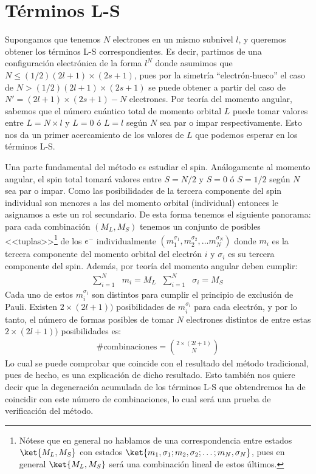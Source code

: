 
\section{Términos L-S}\label{sec: terminos L-S}
Supongamos que tenemos $N$ electrones en un mismo subnivel $l$, y queremos obtener los términos L-S correspondientes. Es decir, partimos de una configuración electrónica de la forma $l^{N}$ donde asumimos que $N \leq (1/2)(2l + 1)\times (2s+1)$, pues por la simetría ``electrón-hueco'' el caso de $N > (1/2)(2l + 1)\times (2s+1)$ se puede obtener a partir del caso de $N' = (2l + 1)\times (2s+1) - N$ electrones. Por teoría del momento angular, sabemos que el número cuántico total de momento orbital $L$ puede tomar valores entre $L= N \times l$ y $ L =0$ ó $L=l$ según $N$ sea par o impar respectivamente. Esto nos da un primer acercamiento de los valores de $L$ que podemos esperar en los términos L-S. \par
Una parte fundamental del método es estudiar el spin. Análogamente al momento angular, el spin total tomará valores entre $S = N/2$ y $S = 0$ ó $S = 1/2$ según $N$ sea par o impar. Como las posibilidades de la tercera componente del spin individual son menores a las del momento orbital (individual) entonces le asignamos a este un rol secundario. De esta forma tenemos el siguiente panorama: para cada combinación $(M_{L},M_{S})$ tenemos un conjunto de posibles <<tuplas>>\footnote{Nótese que en general no hablamos de una correspondencia entre estados $\ket{M_{L},M_{S}}$ con estados $\ket{m_{1}, \sigma_{1};m_{2},\sigma_{2};\dots ; m_{N}, \sigma_{N}}$, pues en general $\ket{M_{L}, M_{S}}$ será una combinación lineal de estos últimos.}  de los $e^{-}$ individualmente $(m_{1}^{\sigma_{1}}, m_{2}^{\sigma_{2}},\dots m_{N}^{\sigma_{N}})$ donde $m_{i}$ es la tercera componente del momento orbital del electrón $i$ y $\sigma_{i}$ es su tercera componente del spin.  Además, por teoría del momento angular deben cumplir: 
\begin{align}
  \sum_{i=1}^{N} &m_{i} = M_{L} & \sum_{i=1}^{N} &\sigma_{i} = M_{S} \label{eq: suma de 3as componentes} 
\end{align}
Cada uno de estos $m_{i}^{\sigma_{i}}$ son distintos para cumplir el principio de exclusión de Pauli. Existen $2\times(2l + 1))$ posibilidades de $m_{i}^{\sigma_{i}}$ para cada electrón, y por lo tanto, el número de formas posibles de tomar $N$ electrones distintos de entre estas $2\times(2l + 1))$ posibilidades es:
\begin{align}
\# \text{combinaciones} = \binom{2 \times (2l+1)}{N}\label{eq: numero de combinaciones final}
\end{align}
Lo cual se puede comprobar que coincide con el resultado del método tradicional, pues de hecho, es una explicación de dicho resultado. Esto también nos quiere decir que la degeneración acumulada de los términos L-S que obtendremos ha de coincidir con este número de combinaciones, lo cual será una prueba de verificación del método. \par 

